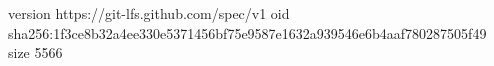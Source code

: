 version https://git-lfs.github.com/spec/v1
oid sha256:1f3ce8b32a4ee330e5371456bf75e9587e1632a939546e6b4aaf780287505f49
size 5566
